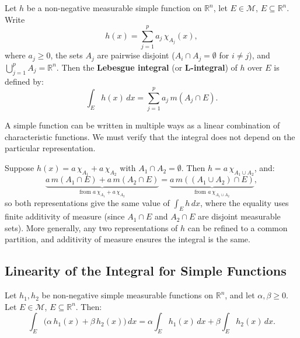 \documentclass[11pt]{report}
\begin{document}
\begin{defbox}
Let $h$ be a non-negative measurable simple function on $\mathbb{R}^n$, let $E \in \mathcal{M}$, $E \subseteq \mathbb{R}^n$. Write
\[
h(x) = \sum_{j=1}^{p} a_j \, \chi_{A_j}(x),
\]
where $a_j \geq 0$, the sets $A_j$ are pairwise disjoint ($A_i \cap A_j = \emptyset$ for $i \neq j$), and $\bigcup_{j=1}^{p} A_j = \mathbb{R}^n$. Then the \textbf{Lebesgue integral} (or \textbf{L-integral}) of $h$ over $E$ is defined by:
\[
\int_E h(x)\,dx = \sum_{j=1}^{p} a_j \, m(A_j \cap E).
\]
\end{defbox}

\begin{rembox}
A simple function can be written in multiple ways as a linear combination of characteristic functions. We must verify that the integral does not depend on the particular representation.

Suppose $h(x) = a\,\chi_{A_1} + a\,\chi_{A_2}$ with $A_1 \cap A_2 = \emptyset$. Then $h = a\,\chi_{A_1 \cup A_2}$, and:
\[
\underbrace{a\,m(A_1 \cap E) + a\,m(A_2 \cap E)}_{\text{from } a\,\chi_{A_1} + a\,\chi_{A_2}} = \underbrace{a\,m((A_1 \cup A_2) \cap E)}_{\text{from } a\,\chi_{A_1 \cup A_2}},
\]
so both representations give the same value of $\int_E h\,dx$, where the equality uses finite additivity of measure (since $A_1 \cap E$ and $A_2 \cap E$ are disjoint measurable sets). More generally, any two representations of $h$ can be refined to a common partition, and additivity of measure ensures the integral is the same.
\end{rembox}

\subsection{Linearity of the Integral for Simple Functions}

\begin{propbox}[Linearity]
Let $h_1, h_2$ be non-negative simple measurable functions on $\mathbb{R}^n$, and let $\alpha, \beta \geq 0$. Let $E \in \mathcal{M}$, $E \subseteq \mathbb{R}^n$. Then:
\[
\int_E \bigl(\alpha\, h_1(x) + \beta\, h_2(x)\bigr)\,dx = \alpha \int_E h_1(x)\,dx + \beta \int_E h_2(x)\,dx.
\]
\end{propbox}
\end{document}
